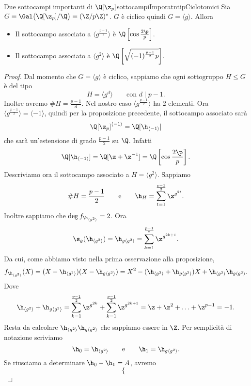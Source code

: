 \begin{prop}{Due sottocampi importanti di \(\Q[\z_p]\)}{sottocampiImporatntipCiclotomici}
	Sia \(G=\Gal\big(\Q[\z_p]/\Q\big) = (\Z/p\Z)^*\). \(G\) è ciclico quindi \(G=\langle g \rangle\). Allora
	\begin{itemize}
		\item Il sottocampo associato a \(\langle g^{\frac{p-1}{2}} \rangle\) è \(\Q \left[ \cos \frac{2\p}{p} \right]\).
		\item Il sottocampo associato a \(\langle g^{2} \rangle\) è \(\Q \left[ \sqrt{(-1)^{\frac{p-1}{2}}p} \right]\).
	\end{itemize}
\end{prop}

\begin{proof}
	Dal momento che \(G=\langle g \rangle\) è ciclico, sappiamo che ogni sottogruppo \(H\le G\) è del tipo
	\[
		H = \langle g^d \rangle \qquad\text{con }d\mid p-1.
	\]
	Inoltre avremo \(\#H = \frac{p-1}{d}\).
	Nel nostro caso \(\langle g^{\frac{p-1}{2}} \rangle\) ha \(2\) elementi.
	Ora \(\langle g^{\frac{p-1}{2}} \rangle = \langle -1 \rangle\), quindi per la proposizione precedente, il sottocampo associato sarà
	\[
		\Q[\z_p]^{\langle -1 \rangle} = \Q[\h_{\langle -1 \rangle}]
	\]
	che sarà un'estensione di grado \(\frac{p-1}{2}\) su \(\Q\). Infatti
	\[
		\Q[\h_{\langle -1 \rangle}] = \Q[\z+\z^{-1}] = \Q\left[\cos \frac{2\p}{p}\right].
	\]
	Descriviamo ora il sottocampo associato a \(H=\langle g^2 \rangle\). Sappiamo
	\[
		\#H = \frac{p-1}{2} \qquad\text{e}\qquad \h_H = \sum_{t=1}^{\frac{p-1}{2}} \z^{g^{2t}}.
	\]
	Inoltre sappiamo che \(\deg f_{\h_{\langle g^2 \rangle}} = 2\). Ora
	\[
		\s_g (\h_{\langle g^2 \rangle}) = \h_{g\langle g^2 \rangle} = \sum_{k=1}^{\frac{p-1}{2}} \z^{g^{2k+1}}.
	\]
	Da cui, come abbiamo visto nella prima osservazione alla proposizione,
	\[
		f_{\h_{\langle g^2 \rangle}}(X) = (X-\h_{\langle g^2 \rangle}) (X-\h_{g\langle g^2 \rangle}) = X^2-(\h_{\langle g^2 \rangle}+\h_{g \langle g^2 \rangle})X + \h_{\langle g^2 \rangle}\h_{g \langle g^2 \rangle}.
	\]
	Dove
	\[
		\h_{\langle g^2 \rangle} + \h_{g \langle g^2 \rangle} = \sum_{k=1}^{\frac{p-1}{2}} \z^{g^{2k}} + \sum_{k=1}^{\frac{p-1}{2}} \z^{g^{2k+1}} = \z+\z^2 + \ldots + \z^{p-1} = -1.
	\]
	Resta da calcolare \(\h_{\langle g^2 \rangle} \h_{g\langle g^2 \rangle}\) che sappiamo essere in \(\Z\).
	Per semplicità di notazione scriviamo
	\[
		\h_0 = \h_{\langle g^2 \rangle} \qquad\text{e}\qquad \h_1 = \h_{g \langle g^2 \rangle}.
	\]
	Se riusciamo a determinare \(\h_0-\h_1=A\), avremo
	\[
		\begin{cases}

\end{cases}\]
\end{proof}
